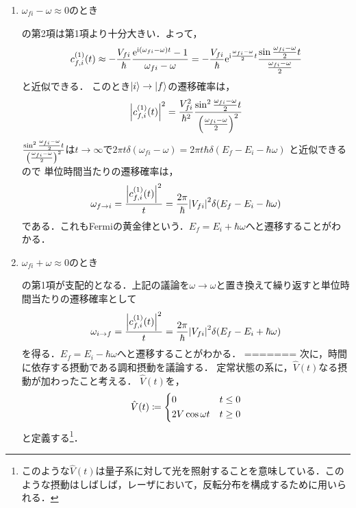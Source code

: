 \documentclass{report}
\begin{document}
  \begin{enumerate}
    \item $\omega_{fi} - \omega \approx 0$のとき\par
      の第2項は第1項より十分大きい．よって，
      \begin{align}
        c_{f, i}^{(1)}(t)\approx - \frac{V_{fi}}{\hbar}\frac{\mathrm{e}^{\mathrm{i}(\omega_{fi} - \omega)t} - 1}{\omega_{fi} - \omega} = -\frac{V_{fi}}{\hbar}\mathrm{e}^{\mathrm{i}\frac{\omega_{fi} - \omega}{2}t}\frac{\sin\frac{\omega_{fi} - \omega}{2}t}{\frac{\omega_{fi} - \omega}{2}}
      \end{align}
      と近似できる．
      このとき$\ket{i}\to\ket{f}$の遷移確率は，
      \begin{align}
        \abs{c_{f, i}^{(1)}(t)}^2 = \frac{V_{fi}^2}{\hbar^2}\frac{\sin^2\frac{\omega_{fi} - \omega}{2}t}{\qty(\frac{\omega_{fi} - \omega}{2})^2}
      \end{align}
      $\frac{\sin^2\frac{\omega_{fi} - \omega}{2}t}{\qty(\frac{\omega_{fi} - \omega}{2})^2}$は$t\to\infty$で$2\pi t\delta(\omega_{fi} - \omega) = 2\pi t\hbar\delta(E_f - E_i - \hbar\omega)$
      と近似できるので
      単位時間当たりの遷移確率は，
      \begin{align}
        \omega_{f\to i} = \frac{\abs{c_{f, i}^{(1)}(t)}^2}{t} = \frac{2\pi}{\hbar}\abs{V_{fi}}^2\delta(E_f - E_i - \hbar\omega)
      \end{align}
      である．これもFermiの黄金律という．$E_f = E_i + \hbar\omega$へと遷移することがわかる．
    \item $\omega_{fi} + \omega\approx 0$のとき\par
      の第1項が支配的となる．上記の議論を$\omega\to\omega$と置き換えて繰り返すと単位時間当たりの遷移確率として
      \begin{align}
        \omega_{i\to f} = \frac{\abs{c_{f,i}^{(1)}(t)}^2}{t} = \frac{2\pi}{\hbar}\abs{V_{fi}}^2\delta(E_f - E_i + \hbar\omega)
      \end{align}
      を得る．$E_f = E_i - \hbar\omega$へと遷移することがわかる．
=======
  次に，時間に依存する摂動である調和摂動を議論する．
  定常状態の系に，$\hat{V}(t)$なる摂動が加わったこと考える．
  $\hat{V}(t)$を，
  \begin{align}
    \hat{V}(t) \coloneqq
    \begin{dcases}
      0 & t \leq 0 \\
      2V\cos\omega t & t \geq 0 
    \end{dcases}
  \end{align}
  と定義する\footnote{このような$\hat{V}(t)$は量子系に対して光を照射することを意味している．このような摂動はしばしば，レーザにおいて，反転分布を構成するために用いられる．}．

\end{enumerate}
\end{document}
